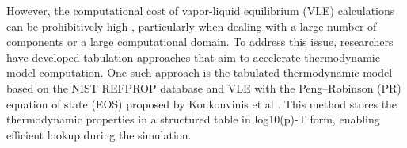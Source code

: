 However, the computational cost of vapor-liquid equilibrium (VLE) calculations can be prohibitively high \cite{yi2019numerical,yang2020real,zhang2022multicomponent}, particularly when dealing with a large number of components or a large computational domain. To address this issue, researchers have developed tabulation approaches that aim to accelerate thermodynamic model computation.
One such approach is the tabulated thermodynamic model based on the NIST REFPROP database and VLE with the Peng–Robinson (PR) equation of state (EOS) proposed by Koukouvinis et al \cite{koukouvinis2020high}. This method stores the thermodynamic properties in a structured table in log10(p)-T form, enabling efficient lookup during the simulation.
